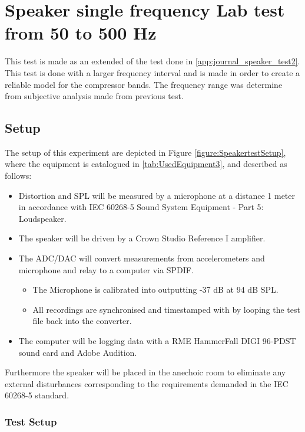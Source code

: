 \chapter{Speaker single frequency Lab test from 50 to 500 Hz} \label{app:journal_speaker_test3}

This test is made as an extended of the test done in \autoref{app:journal_speaker_test2}. This test is done with a larger frequency interval and is made in order to create a reliable model for the compressor bands. The frequency range was determine from subjective analysis made from previous test.


\section{Setup}

The setup of this experiment are depicted in Figure \ref{figure:SpeakertestSetup}, where the equipment is catalogued in \autoref{tab:UsedEquipment3}, and described as follows:
\vspace{-5mm}
\begin{itemize}
\item Distortion and \gls{SPL} will be measured by a microphone at a distance 1 meter in accordance with IEC 60268-5 Sound System Equipment - Part 5: Loudspeaker.
\item The speaker will be driven by a Crown Studio Reference I amplifier.
\item The ADC/DAC will convert measurements from accelerometers and microphone and relay to a computer via SPDIF.
\begin{itemize}
\item The Microphone is calibrated into outputting -37 dB at 94 dB \gls{SPL}.
\item All recordings are synchronised and timestamped with by looping the test file back into the converter.
\end{itemize}
\item The computer will be logging data with a RME HammerFall DIGI 96-PDST sound card and Adobe Audition.
\end{itemize}
\vspace{-5mm}
Furthermore the speaker will be placed in the anechoic room to eliminate any external disturbances corresponding to the requirements demanded in the 
IEC 60268-5 standard.

\subsection*{Test Setup}

